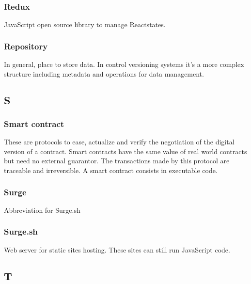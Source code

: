 \subsubsection*{Redux}
JavaScript open source library to manage React\glosp states.

\subsubsection*{Repository}
In general, place to store data. In control versioning systems it's a more complex structure including metadata and operations for data management.


\subsection*{S}

\subsubsection*{Smart contract}
These are protocols to ease, actualize and verify the negotiation of the digital version of a contract. Smart contracts have the same value of real world contracts but need no external guarantor. The transactions made by this protocol are traceable and irreversible. A smart contract consists in executable code.


\subsubsection*{Surge}
Abbreviation for Surge.sh

\subsubsection*{Surge.sh}
Web server for static sites hosting. These sites can still run JavaScript code.


\subsection*{T}

